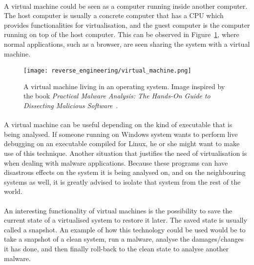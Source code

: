 \paragraph{}
A virtual machine could be seen as a computer running inside another computer. The host computer is usually a concrete computer that has a CPU which provides functionalities for virtualisation, and the guest computer is the computer running on top of the host computer. This can be observed in Figure~\ref{fig:virtual_machine}, where normal applications, such as a browser, are seen sharing the system with a virtual machine.

\begin{figure}[!htb]
	\centering
	\texttt{[image: reverse\_engineering/virtual\_machine.png]}
	\caption{A virtual machine living in an operating system. Image inspired by the book \textit{Practical Malware Analysis: The Hands-On Guide to Dissecting Malicious Software}~\cite{sikorski2012practical}.}
	\label{fig:virtual_machine}
\end{figure}

\paragraph{}
A virtual machine can be useful depending on the kind of executable that is being analysed. If someone running on Windows system wants to perform live debugging on an executable compiled for Linux, he or she might want to make use of this technique. Another situation that justifies the need of virtualisation is when dealing with malware applications. Because these programs can have disastrous effects on the system it is being analysed on, and on the neighbouring systems as well, it is greatly advised to isolate that system from the rest of the world.

\paragraph{}
An interesting functionality of virtual machines is the possibility to save the current state of a virtualised system to restore it later. The saved state is usually called a snapshot. An example of how this technology could be used would be to take a snapshot of a clean system, run a malware, analyse the damages/changes it has done, and then finally roll-back to the clean state to analyse another malware.

